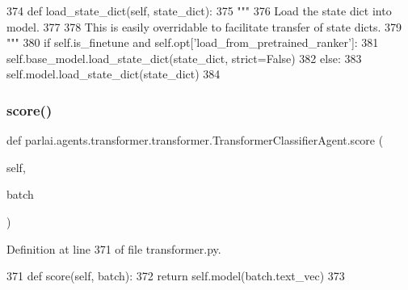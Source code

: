 \begin{DoxyCode}
374     \textcolor{keyword}{def }load\_state\_dict(self, state\_dict):
375         \textcolor{stringliteral}{"""}
376 \textcolor{stringliteral}{        Load the state dict into model.}
377 \textcolor{stringliteral}{}
378 \textcolor{stringliteral}{        This is easily overridable to facilitate transfer of state dicts.}
379 \textcolor{stringliteral}{        """}
380         \textcolor{keywordflow}{if} self.is\_finetune \textcolor{keywordflow}{and} self.opt[\textcolor{stringliteral}{'load\_from\_pretrained\_ranker'}]:
381             self.base\_model.load\_state\_dict(state\_dict, strict=\textcolor{keyword}{False})
382         \textcolor{keywordflow}{else}:
383             self.model.load\_state\_dict(state\_dict)
384 \end{DoxyCode}
\mbox{\label{classparlai_1_1agents_1_1transformer_1_1transformer_1_1TransformerClassifierAgent_a2ba169f62c0d0e69945de1ced8e39556}} 
\subsubsection{\texorpdfstring{score()}{score()}}
{\footnotesize\ttfamily def parlai.\+agents.\+transformer.\+transformer.\+Transformer\+Classifier\+Agent.\+score (\begin{DoxyParamCaption}\item[{}]{self,  }\item[{}]{batch }\end{DoxyParamCaption})}



Definition at line 371 of file transformer.\+py.


\begin{DoxyCode}
371     \textcolor{keyword}{def }score(self, batch):
372         \textcolor{keywordflow}{return} self.model(batch.text\_vec)
373 
\end{DoxyCode}
\mbox{\label{classparlai_1_1agents_1_1transformer_1_1transformer_1_1TransformerClassifierAgent_aee8f573263ce8a01ae1c1f2353ba3e58}} 
